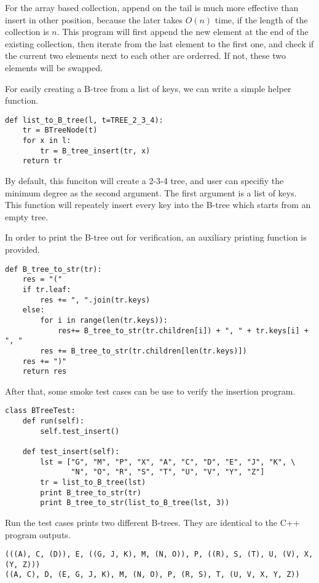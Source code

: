 \documentclass{article}
\begin{document}
For the array based collection, append on the tail is much more effective than
insert in other position, because the later takes $O(n)$ time, if the length
of the collection is $n$. This program will first append the new element at
the end of the existing collection, then iterate from the last element to
the first one, and check if the current two elements next to each other
are orderred. If not, these two elements will be swapped. 

For easily creating a B-tree from a list of keys, we can write a simple helper
function.

\begin{lstlisting}
def list_to_B_tree(l, t=TREE_2_3_4):
    tr = BTreeNode(t)
    for x in l:
        tr = B_tree_insert(tr, x)
    return tr
\end{lstlisting}

By default, this funciton will create a 2-3-4 tree, and user can specifiy the
minimum degree as the second argument. The first argument is a list of keys.
This function will repeately insert every key into the B-tree which starts
from an empty tree.

In order to print the B-tree out for verification, an auxiliary printing
function is provided.

\begin{lstlisting}
def B_tree_to_str(tr):
    res = "("
    if tr.leaf:
        res += ", ".join(tr.keys)
    else:
        for i in range(len(tr.keys)):
            res+= B_tree_to_str(tr.children[i]) + ", " + tr.keys[i] + ", "
        res += B_tree_to_str(tr.children[len(tr.keys)])
    res += ")"
    return res
\end{lstlisting}

After that, some smoke test cases can be use to verify the insertion 
program.

\begin{lstlisting}
class BTreeTest:
    def run(self):
        self.test_insert()

    def test_insert(self):
        lst = ["G", "M", "P", "X", "A", "C", "D", "E", "J", "K", \
               "N", "O", "R", "S", "T", "U", "V", "Y", "Z"]
        tr = list_to_B_tree(lst)
        print B_tree_to_str(tr)
        print B_tree_to_str(list_to_B_tree(lst, 3))
\end{lstlisting}

Run the test cases prints two different B-trees. They are identical 
to the C++ program outputs.

\begin{verbatim}
(((A), C, (D)), E, ((G, J, K), M, (N, O)), P, ((R), S, (T), U, (V), X, (Y, Z)))
((A, C), D, (E, G, J, K), M, (N, O), P, (R, S), T, (U, V, X, Y, Z))
\end{verbatim}
\end{document}
